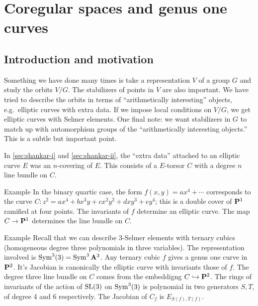 
\section{Coregular spaces and genus one curves}





\subsection{Introduction and motivation}

Something we have done many times is take a representation $V$ of a group $G$ 
and study the orbits $V/G$. The stabilizers of points in $V$ are also 
important. We have tried to describe the orbits in terms of ``arithmetically 
interesting'' objects, e.g.~elliptic curves with extra data. If we impose 
local conditions on $V/G$, we get elliptic curves with Selmer elements. One 
final note: we want stabilizers in $G$ to match up with automorphism groups of 
the ``arithmetically interesting objects.'' This is a subtle but important 
point. 

In \autoref{sec:shankar-i} and \autoref{sec:shankar-ii}, the ``extra data'' 
attached to an elliptic curve $E$ was an $n$-covering of $E$. This consists 
of a $E$-torsor $C$ with a degree $n$ line bundle on $C$. 

\begin{enonce}[remark]{Example}
In the binary quartic case, the form $f(x,y) = a x^4 + \cdots$ corresponds to 
the curve $C:z^2 = a x^4 + b x^3 y + c x^2 y^2 + d x y^3 + e y^4$; this is a 
double cover of $\mathbf{P}^1$ ramified at four points. The invariants of $f$ 
determine an elliptic curve. The map $C\to \mathbf{P}^1$ determines the line bundle 
on $C$. 
\end{enonce}

\begin{enonce}[remark]{Example}
Recall that we can describe 3-Selmer elements with ternary cubics (homogeneous 
degree three polynomials in three variables). The representation involved 
is $\operatorname{Sym}^3(3) = \operatorname{Sym}^3\mathbf{A}^3$. Any ternary cubic $f$ gives a genus 
one curve in $\mathbf{P}^2$. It's Jacobian is canonically the elliptic curve with 
invariants those of $f$. The degree three line bundle on $C$ comes from the 
embeddigng $C\hookrightarrow \mathbf{P}^2$. The rings of invariants of the action of 
$\operatorname{SL}(3)$ on $\operatorname{Sym}^3(3)$ is polynomial in two generators 
$S,T$, of degree 4 and 6 respectively. The Jacobian of $C_f$ is 
$E_{S(f),T(f)}$. 
\end{enonce}

